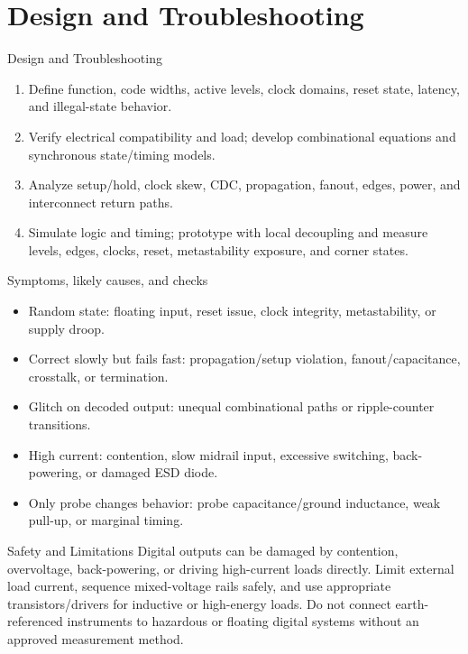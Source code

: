 \documentclass[10pt,letterpaper]{article}
\begin{document}
\section{Design and Troubleshooting}
\begin{CornellExamBox}{Design and Troubleshooting}
\begin{enumerate}
  \item Define function, code widths, active levels, clock domains, reset state, latency, and illegal-state behavior.
  \item Verify electrical compatibility and load; develop combinational equations and synchronous state/timing models.
  \item Analyze setup/hold, clock skew, CDC, propagation, fanout, edges, power, and interconnect return paths.
  \item Simulate logic and timing; prototype with local decoupling and measure levels, edges, clocks, reset, metastability exposure, and corner states.
\end{enumerate}\end{CornellExamBox}
\begin{CornellExamBox}{Symptoms, likely causes, and checks}
\begin{itemize}
  \item Random state: floating input, reset issue, clock integrity, metastability, or supply droop.
  \item Correct slowly but fails fast: propagation/setup violation, fanout/capacitance, crosstalk, or termination.
  \item Glitch on decoded output: unequal combinational paths or ripple-counter transitions.
  \item High current: contention, slow midrail input, excessive switching, back-powering, or damaged ESD diode.
  \item Only probe changes behavior: probe capacitance/ground inductance, weak pull-up, or marginal timing.
\end{itemize}\end{CornellExamBox}
\begin{CornellWarningBox}{Safety and Limitations}
Digital outputs can be damaged by contention, overvoltage, back-powering, or driving high-current loads directly. Limit external load current, sequence mixed-voltage rails safely, and use appropriate transistors/drivers for inductive or high-energy loads. Do not connect earth-referenced instruments to hazardous or floating digital systems without an approved measurement method.
\end{CornellWarningBox}
\end{document}
